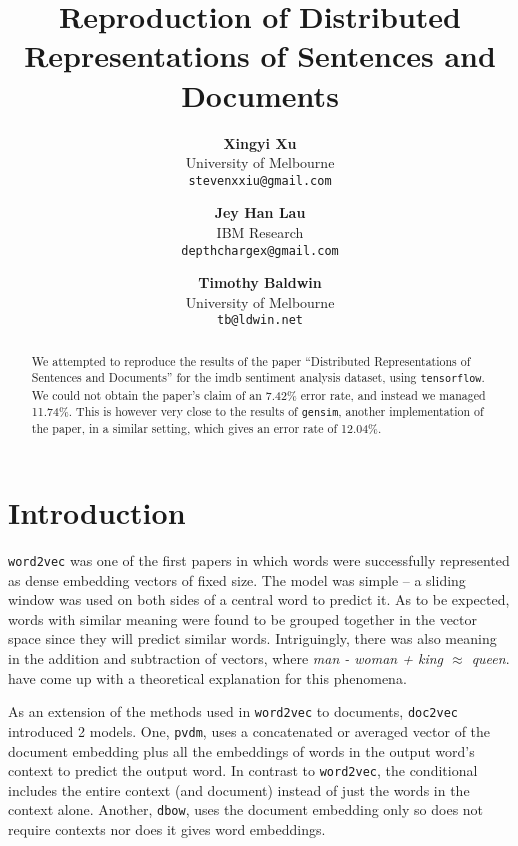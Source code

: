\documentclass{article}
\begin{document}
\title{Reproduction of Distributed Representations of Sentences and Documents}

\author{
  \textbf{Xingyi Xu} \\ University of Melbourne \\ \texttt{stevenxxiu@gmail.com} \and
  \textbf{Jey Han Lau} \\ IBM Research \\ \texttt{depthchargex@gmail.com} \and
  \textbf{Timothy Baldwin} \\ University of Melbourne \\ \texttt{tb@ldwin.net}
}
\maketitle

\begin{abstract}
We attempted to reproduce the results of the paper ``Distributed Representations of Sentences and Documents'' for the imdb sentiment analysis dataset, using \texttt{tensorflow}. We could not obtain the paper's claim of an 7.42\% error rate, and instead we managed 11.74\%. This is however very close to the results of \texttt{gensim}, another implementation of the paper, in a similar setting, which gives an error rate of 12.04\%.
\end{abstract}

\section{Introduction}
\texttt{word2vec} \citep{mikolov_distributed_2013} was one of the first papers in which words were successfully represented as dense embedding vectors of fixed size. The model was simple -- a sliding window was used on both sides of a central word to predict it. As to be expected, words with similar meaning were found to be grouped together in the vector space since they will predict similar words. Intriguingly, there was also meaning in the addition and subtraction of vectors, where \textit{man - woman + king $\approx$ queen}. \cite{arora_rand-walk:_2015} have come up with a theoretical explanation for this phenomena.

As an extension of the methods used in \texttt{word2vec} to documents, \texttt{doc2vec} \citep{le_distributed_2014} introduced 2 models. One, \texttt{pvdm}, uses a concatenated or averaged vector of the document embedding plus all the embeddings of words in the output word's context to predict the output word. In contrast to \texttt{word2vec}, the conditional includes the entire context (and document) instead of just the words in the context alone. Another, \texttt{dbow}, uses the document embedding only so does not require contexts nor does it gives word embeddings.
\end{document}

